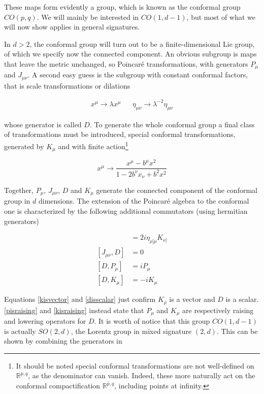 These maps form evidently a group, which is known as the conformal group $CO(p,q)$. We will mainly be interested in $CO(1,d-1)$, but most of what we will now show applies in general signatures.

In $d>2$, the conformal group will turn out to be a finite-dimensional Lie group, of which we specify now the connected component. An obvious subgroup is maps that leave the metric unchanged, so Poincar\'e transformations, with generators $P_\mu$ and $J_{\mu\nu}$. A second easy guess is the subgroup with constant conformal factors, that is scale transformations or dilations

\begin{align}
	x^\mu \rightarrow \lambda x^\mu && \eta_{\mu\nu} \rightarrow \lambda^{-2} \eta_{\mu\nu}
	\label{}
\end{align}

whose generator is called $D$. To generate the whole conformal group a final class of transformations must be introduced, special conformal transformations, generated by $K_\mu$ and with finite action\footnote{It should be noted special conformal transformations are not well-defined on $\mathbb{R}^{p,q}$, as the denominator can vanish. Indeed, these more naturally act on the conformal compactification $\overline{\mathbb{R}^{p,q}}$, including points at infinity.}

\begin{equation}
	x^\mu \rightarrow \frac{x^\mu - b^\mu x^2}{1-2 b^\nu x_\nu + b^2 x^2}
	\label{}
\end{equation}

Together, $P_\mu$, $J_{\mu\nu}$, $D$ and $K_\mu$ generate the connected component of the conformal group in $d$ dimensions. The extension of the Poincar\'e algebra to the conformal one is characterized by the following additional commutators (using hermitian generators)

\begin{align}
	[J_{\mu\nu},K_\rho] 	&= 2i \eta_{\rho[\mu} K_{\nu]}	\label{kisvector}\\
	[J_{\mu\nu},D] 		&= 0 				\label{disscalar}\\
	[D, P_\mu] 		&= i P_\mu 			\label{pisraising}\\
	[D, K_\mu] 		&= -i K_\mu			\label{kisraising}
\end{align}

Equations \eqref{kisvector} and \eqref{disscalar} just confirm $K_\rho$ is a vector and $D$ is a scalar. \eqref{pisraising} and \eqref{kisraising} instead state that $P_\mu$ and $K_\mu$ are respectively raising and lowering operators for $D$. It is worth of notice that this group $CO(1,d-1)$ is actually $SO(2,d)$, the Lorentz group in mixed signature $(2,d)$. This can be shown by combining the generators in

